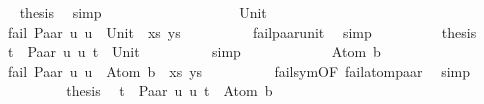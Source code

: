\begin{isabellebody}
\ \isamarkupfalse%
\ {\isacharquery}{\kern0pt}thesis\ \isamarkupfalse%
\ simp\isanewline
\ \ \ \ \ \ \isamarkupfalse%
\isanewline
\ \ \ \ \isamarkupfalse%
\isanewline
\ \ \ \ \ \ \isamarkupfalse%
\ Unit\isanewline
\ \ \ \ \ \ %
\isanewline
\ \ \ \ \ \ \isamarkupfalse%
\ {\isachardoublequoteopen}fail\ {\isacharparenleft}{\kern0pt}{\isacharparenleft}{\kern0pt}Paar\ u{}\ u{}\ {\isasymapprox}{\isacharquery}{\kern0pt}\ Unit{\isacharparenright}{\kern0pt}\ {\isacharhash}{\kern0pt}\ xs{\isacharcomma}{\kern0pt}\ ys{\isacharparenright}{\kern0pt}{\isachardoublequoteclose}\isanewline
\ \ \ \ \ \ \ \ \isamarkupfalse%
\ fail{\isacharunderscore}{\kern0pt}paar{\isacharunderscore}{\kern0pt}unit\ \isamarkupfalse%
\ simp\isanewline
\ \ \ \ \ \ \isamarkupfalse%
\ \isamarkupfalse%
\ {\isacharquery}{\kern0pt}thesis\ \isamarkupfalse%
\ {\isacartoucheopen}t{}\ {\isacharequal}{\kern0pt}\ Paar\ u{}\ u{}{\isacartoucheclose}\ {\isacartoucheopen}t{}\ {\isacharequal}{\kern0pt}\ Unit{\isacartoucheclose}\isanewline
\ \ \ \ \ \ \ \ \isamarkupfalse%
\ simp\isanewline
\ \ \ \ \isamarkupfalse%
\isanewline
\ \ \ \ \ \ \isamarkupfalse%
\ {\isacharparenleft}{\kern0pt}Atom\ b{\isacharparenright}{\kern0pt}\isanewline
\ \ \ \ \ \ %
\isanewline
\ \ \ \ \ \ \isamarkupfalse%
\ {\isachardoublequoteopen}fail\ {\isacharparenleft}{\kern0pt}{\isacharparenleft}{\kern0pt}Paar\ u{}\ u{}\ {\isasymapprox}{\isacharquery}{\kern0pt}\ Atom\ b{\isacharparenright}{\kern0pt}\ {\isacharhash}{\kern0pt}\ xs{\isacharcomma}{\kern0pt}\ ys{\isacharparenright}{\kern0pt}{\isachardoublequoteclose}\isanewline
\ \ \ \ \ \ \ \ \isamarkupfalse%
\ fail{\isacharunderscore}{\kern0pt}sym{\isacharbrackleft}{\kern0pt}OF\ fail{\isacharunderscore}{\kern0pt}atom{\isacharunderscore}{\kern0pt}paar{\isacharbrackright}{\kern0pt}\ \isamarkupfalse%
\ simp\isanewline
\ \ \ \ \ \ \isamarkupfalse%
\ \isamarkupfalse%
\ {\isacharquery}{\kern0pt}thesis\ \isamarkupfalse%
\ {\isacartoucheopen}t{}\ {\isacharequal}{\kern0pt}\ Paar\ u{}\ u{}{\isacartoucheclose}\ {\isacartoucheopen}t{}\ {\isacharequal}{\kern0pt}\ Atom\ b{\isacartoucheclose}\isanewline

\end{isabellebody}
